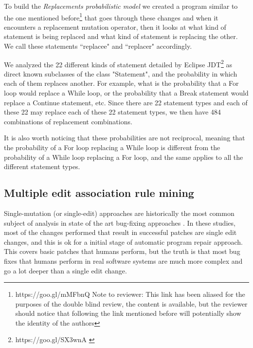 \documentclass[conference]{IEEEtran}
\begin{document}
To build the \textit{Replacements probabilistic model} we created a 
program similar to the one mentioned before\footnote{https://goo.gl/mMFbnQ
Note to reviewer: This link has been aliased for the purposes of the double 
blind review, the content is available, but the reviewer should notice that 
following the link mentioned before will potentially show the identity of the authors} that 
goes through these 
changes and when it encounters a  replacement mutation operator, then it looks 
at what kind of statement is being 
replaced and what kind of statement is replacing the other. We call these 
statements ``replacee" and ``replacer" accordingly.


We analyzed the 22 different kinds of statement detailed by Eclipse JDT\footnote{https://goo.gl/SX3wnA \label{stmtNames}} as
direct known subclasses of the class "Statement", and the probability in which
each of  
them replaces another. For example, what is the probability that a For loop 
would replace a While loop, or the probability that a Break statement would 
replace a Continue statement, etc. Since there are 22 statement types and each of these 22 may 
replace each of these 22 statement types, we then have 484 combinations of 
replacement combinations.

It is also worth noticing that these probabilities are not reciprocal, meaning 
that the probability of a For loop replacing a While loop is different from the 
probability of a While loop replacing a For loop, and the same applies to all 
the different statement types.

\subsection{Multiple edit association rule mining} \label{multEdit}

Single-mutation (or single-edit) approaches are historically the most 
common subject of analysis in 
state of the art bug-fixing approaches
\cite{Qi15,fan15,kim2013,Long2016,legoues12,Qi13,Qi14,xuan16}.
In these studies, most of the changes performed that result in 
successful patches are single edit changes, and this is ok for a initial stage 
of automatic program repair approach. This covers basic patches that humans 
perform, but the truth is that most bug fixes that humans perform in real 
software systems are much more complex and go a lot deeper than a single edit 
change. 
\end{document}
